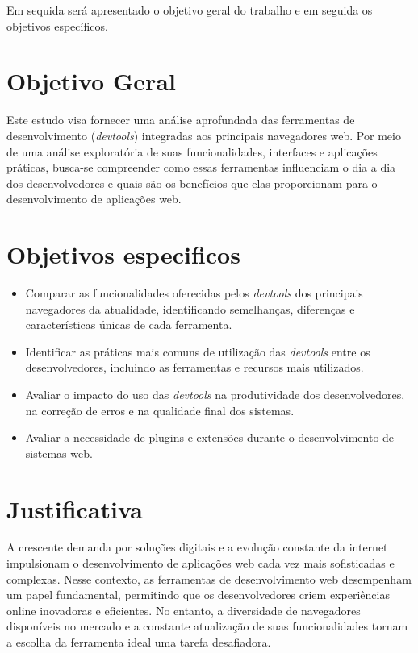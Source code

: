 Em sequida será apresentado o objetivo geral do trabalho e em seguida os objetivos específicos.

\section{Objetivo Geral}
Este estudo visa fornecer uma análise aprofundada das ferramentas de desenvolvimento (\textit{devtools}) integradas aos principais navegadores web. Por meio de uma análise exploratória de suas funcionalidades, interfaces e aplicações práticas, busca-se compreender como essas ferramentas influenciam o dia a dia dos desenvolvedores e quais são os benefícios que elas proporcionam para o desenvolvimento de aplicações web. 

\section{Objetivos especificos}
\begin{itemize}
    \item Comparar as funcionalidades oferecidas pelos \textit{devtools} dos principais navegadores da atualidade, identificando semelhanças, diferenças e características únicas de cada ferramenta.
    \item Identificar as práticas mais comuns de utilização das \textit{devtools} entre os desenvolvedores, incluindo as ferramentas e recursos mais utilizados.
    \item Avaliar o impacto do uso das \textit{devtools} na produtividade dos desenvolvedores, na correção de erros e na qualidade final dos sistemas.
    \item Avaliar a necessidade de plugins e extensões durante o desenvolvimento de sistemas web.
\end{itemize}


\section{Justificativa}

A crescente demanda por soluções digitais e a evolução constante da internet impulsionam o desenvolvimento de aplicações web cada vez mais sofisticadas e complexas. Nesse contexto, as ferramentas de desenvolvimento web desempenham um papel fundamental, permitindo que os desenvolvedores criem experiências online inovadoras e eficientes. No entanto, a diversidade de navegadores disponíveis no mercado e a constante atualização de suas funcionalidades tornam a escolha da ferramenta ideal uma tarefa desafiadora.

